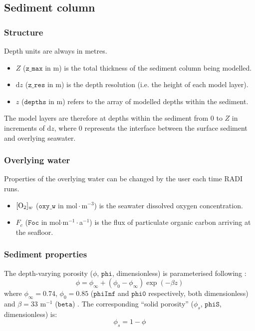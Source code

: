 \documentclass[a4paper]{article}
\newcommand{\D}[1]{\mathrm{d}#1}
\newcommand{\code}[1]{\texttt{#1}}
\newcommand{\molmmm}{\mathrm{mol}\cdot\mathrm{m}^{-3}}
\begin{document}
\subsection{Sediment column}

\subsubsection{Structure}

Depth units are always in metres.
\begin{itemize}
  \item $Z$ ($\code{z\_max}$ in m) is the total thickness of the sediment column being modelled.
  \item $\D{z}$ ($\code{z\_res}$ in m) is the depth resolution (i.e. the height of each model layer).
  \item $z$ ($\code{depths}$ in m) refers to the array of modelled depths within the sediment.
\end{itemize}
The model layers are therefore at depths within the sediment from $0$ to $Z$ in increments of $\D{z}$, where $0$ represents the interface between the surface sediment and overlying seawater.

\subsubsection{Overlying water}

Properties of the overlying water can be changed by the user each time RADI runs.

\begin{itemize}
  \item $[\ce{O2}]_w$ ($\code{oxy\_w}$ in $\molmmm$) is the seawater dissolved oxygen concentration.
  \item $F_c$ ($\code{Foc}$ in mol$\cdot$m$^{-1}\cdot$a$^{-1}$) is the flux of particulate organic carbon arriving at the seafloor.
\end{itemize}

\subsubsection{Sediment properties}

The depth-varying porosity ($\phi$, $\code{phi}$, dimensionless) is parameterised following \citet{boudreau_method--lines_1996}:
\begin{equation}\label{phi}
\phi = \phi_\infty + (\phi_0 - \phi_\infty) \exp(-\beta z)
\end{equation}
where $\phi_\infty = 0.74$, $\phi_0 = 0.85$ ($\code{phiInf}$ and $\code{phi0}$ respectively, both dimensionless) and $\beta = 33$ m$^{-1}$ ($\code{beta}$) \citep{boudreau_method--lines_1996}. The corresponding ``solid porosity'' ($\phi_s$, $\code{phiS}$, dimensionless) is:
\begin{equation}\label{phiS}
\phi_s = 1 - \phi
\end{equation}
\end{document}
